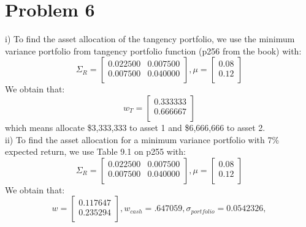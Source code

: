\documentclass{article}
\begin{document}
\section*{Problem 6}
i) To find the asset allocation of the tangency portfolio, we use the minimum variance portfolio from tangency portfolio function (p256 from the book) with:
\begin{equation*}
\Sigma_{R}=%
\begin{bmatrix}{}
 0.022500 & 0.007500 \\ 
  0.007500 & 0.040000 \\ 
  \end{bmatrix},
 \mu = \begin{bmatrix}{} 
0.08 \\
0.12 \\
  \end{bmatrix}
\end{equation*}
We obtain that:
\begin{equation*}
w_{T} = %
\begin{bmatrix}{}
 0.333333 \\ 
  0.666667 \\ 
  \end{bmatrix}
\end{equation*}  
which means allocate \$3,333,333 to asset 1 and \$6,666,666 to asset 2.
\vspace{5mm} \\
ii) To find the asset allocation for a minimum variance portfolio with 7\% expected return, we use Table 9.1 on p255 with:
\begin{equation*}
\Sigma_{R}=%
\begin{bmatrix}{}
 0.022500 & 0.007500 \\ 
  0.007500 & 0.040000 \\ 
  \end{bmatrix},
 \mu = \begin{bmatrix}{} 
0.08 \\
0.12 \\
  \end{bmatrix}
\end{equation*}
We obtain that:
\begin{equation*}
w = %
\begin{bmatrix}{}
 0.117647 \\ 
  0.235294 \\ 
  \end{bmatrix},
w_{cash} = .647059,
\sigma_{portfolio} = 0.0542326,
\end{equation*}
\end{document}
